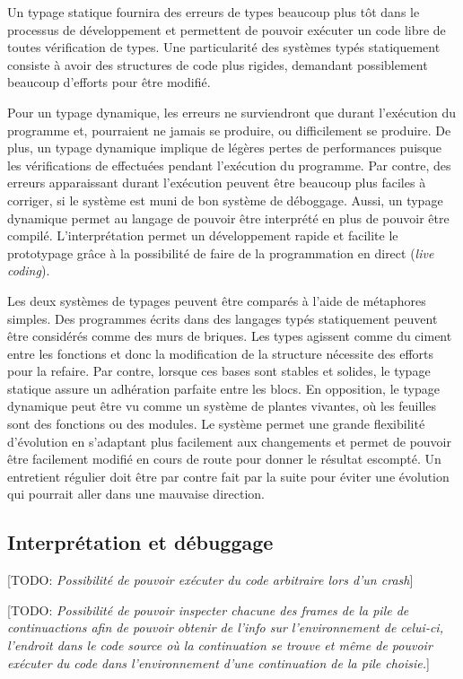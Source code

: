 \documentclass[12pt,oneside,letterpaper,francais]{book}
\newcommand{\todo}[1]{[TODO: {\it #1}]}
\begin{document}
Un typage statique fournira des erreurs de types beaucoup plus tôt
dans le processus de développement et permettent de pouvoir exécuter
un code libre de toutes vérification de types. Une particularité des
systèmes typés statiquement consiste à avoir des structures de code
plus rigides, demandant possiblement beaucoup d'efforts pour être
modifié. 

Pour un typage dynamique, les erreurs ne surviendront que durant
l'exécution du programme et, pourraient ne jamais se produire, ou
difficilement se produire. De plus, un typage dynamique implique de
légères pertes de performances puisque les vérifications de effectuées
pendant l'exécution du programme. Par contre, des erreurs apparaissant
durant l'exécution peuvent être beaucoup plus faciles à corriger, si
le système est muni de bon système de déboggage. Aussi, un typage
dynamique permet au langage de pouvoir être interprété en plus de
pouvoir être compilé. L'interprétation permet un développement rapide
et facilite le prototypage grâce à la possibilité de faire de la
programmation en direct (\textit{live coding}). 

Les deux systèmes de typages peuvent être comparés à l'aide de
métaphores simples. Des programmes écrits dans des langages typés
statiquement peuvent être considérés comme des murs de briques. Les
types agissent comme du ciment entre les fonctions et donc la
modification de la structure nécessite des efforts pour la
refaire. Par contre, lorsque ces bases sont stables et solides, le
typage statique assure un adhération parfaite entre les blocs.  En
opposition, le typage dynamique peut être vu comme un système de
plantes vivantes, où les feuilles sont des fonctions ou des
modules. Le système permet une grande flexibilité d'évolution en
s'adaptant plus facilement aux changements et permet de pouvoir être
facilement modifié en cours de route pour donner le résultat
escompté. Un entretient régulier doit être par contre fait par la
suite pour éviter une évolution qui pourrait aller dans une mauvaise
direction.


\subsection{Interprétation et débuggage}


\todo{Possibilité de pouvoir exécuter du code arbitraire lors d'un
  crash}

\todo{Possibilité de pouvoir inspecter chacune des frames de la pile
  de continuactions afin de pouvoir obtenir de l'info sur
  l'environnement de celui-ci, l'endroit dans le code source où la
  continuation se trouve et même de pouvoir exécuter du code dans
  l'environnement d'une continuation de la pile choisie.}
\end{document}
